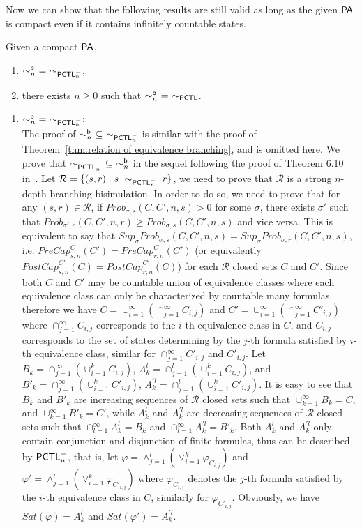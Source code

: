\documentclass{LMCS}
\def\phi{\varphi}
\newcommand{\PA}{{\sf PA}}
\newcommand{\PCTL}{{\sf PCTL}}
\newcommand{\iBSB}[1]{\sim_{#1}^{{\sf b}}}
\newcommand{\EPCTL}{\sim_{\PCTL}}
\newcommand{\iEPCTLM}[1]{\sim_{\PCTL^{-}_{#1}}}
\newcommand{\MC}[1]{\mathcal{#1}}
\newcommand{\MEASURE}{\mathit{Prob}}
\newcommand{\MEASUREONE}{\mathit{PreCap}}
\newcommand{\MEASURETWO}{\mathit{PostCap}}
\newcommand{\SUP}{\mathit{Sup}}
\begin{document}
Now we can show that the following results are still valid as long as the given $\PA$ is compact
even if it contains infinitely countable states.
\begin{thm}\label{thm:infinite i branching}
Given a compact $\PA$,
\begin{enumerate}[\em(1)]
\item $\iBSB{n}~=~\iEPCTLM{n}$,
\item there exists $n\geq 0$ such that $\iBSB{n}~=~\EPCTL$.
\end{enumerate}
\end{thm}
\proof\hfill
\begin{enumerate}[(1)]
\item $\iBSB{n}~=~\iEPCTLM{n}$:\\
The proof of $\iBSB{n}~\subseteq~\iEPCTLM{n}$ is similar with
  the proof of Theorem~\ref{thm:relation of equivalence branching},
  and is omitted here. We prove that $\iEPCTLM{n}~\subseteq~\iBSB{n}$
  in the sequel following the proof of Theorem 6.10
  in~\cite{DesharnaisGJP10}. Let $\MC{R}=\{(s,r)\mid
  s~\iEPCTLM{n}~r\}$, we need to prove that $\MC{R}$ is a strong
  $n$-depth branching bisimulation. In order to do so, we need to
  prove that for any $(s,r)\in\MC{R}$, if
  $\MEASURE_{\sigma,s}(C,C',n,s)>0$ for some $\sigma$, there exists
  $\sigma'$ such that
  $\MEASURE_{\sigma',r}(C,C',n,r)\geq\MEASURE_{\sigma,s}(C,C',n,s)$
  and vice versa. This is equivalent to say that
  $\SUP_{\sigma}\MEASURE_{\sigma,s}(C,C',n,s)=\SUP_{\sigma}\MEASURE_{\sigma,r}(C,C',n,s)$,
  i.e. $\MEASUREONE_{s,n}^{C}(C')=\MEASUREONE_{r,n}^{C}(C')$ (or
  equivalently $\MEASURETWO_{s,n}^{C'}(C)=\MEASURETWO_{r,n}^{C'}(C)$)
for each $\MC{R}$ closed sets $C$ and $C'$. Since
  both $C$ and $C'$ may be countable union of equivalence classes
  where each equivalence class can only be characterized by countable
  many formulas, therefore we have
  $C=\cup_{i=1}^{\infty}(\cap_{j=1}^{\infty}C_{i,j})$ and
  $C'=\cup_{i=1}^{\infty}(\cap_{j=1}^{\infty}C'_{i,j})$ where
  $\cap_{j=1}^{\infty}C_{i,j}$ corresponds to the
  $i$-th equivalence class in $C$, and $C_{i,j}$ corresponds  to
  the set of states determining by the $j$-th formula
  satisfied by $i$-th equivalence class, similar for
  $\cap_{j=1}^{\infty}C'_{i,j}$ and $C'_{i,j}$. Let $B_k =
  \cap_{j=1}^{\infty}(\cup_{i=1}^{k}C_{i,j})$,
  $A_k^l=\cap_{j=1}^{l}(\cup_{i=1}^{k}C_{i,j})$, and $B'_k =
  \cap_{j=1}^{\infty}(\cup_{i=1}^{k}C'_{i,j})$,
  $A_k^{'l}=\cap_{j=1}^{l}(\cup_{i=1}^{k}C'_{i,j})$. It is easy to see
  that $B_k$ and $B'_k$ are increasing sequences of $\MC{R}$ closed
  sets such that $\cup_{k=1}^{\infty}B_k=C$, and
  $\cup_{k=1}^{\infty}B'_k=C'$, while $A_k^l$ and $A_k^{'l}$ are
  decreasing sequences of $\MC{R}$ closed sets such that
  $\cap_{l=1}^{\infty}A_k^l=B_k$ and
  $\cap_{l=1}^{\infty}A_k^{'l}=B'_k$. Both $A_k^l$ and $A_k^{'l}$ only
  contain conjunction and disjunction of finite formulas, thus can be
  described by $\PCTL_n^{-}$, that is, let
  $\phi=\land_{j=1}^l(\lor_{i=1}^k\phi_{C_{i,j}})$ and
  $\phi'=\land_{j=1}^l(\lor_{i=1}^k\phi_{C'_{i,j}})$ where
  $\phi_{C_{i,j}}$ denotes the $j$-th formula satisfied by the $i$-th
  equivalence class in $C$, similarly for
  $\phi_{C'_{i,j}}$. Obviously, we have $\mathit{Sat}(\phi)=A^l_k$ and
  $\mathit{Sat}(\phi')=A^{'l}_k$.


\end{enumerate}
\end{document}
